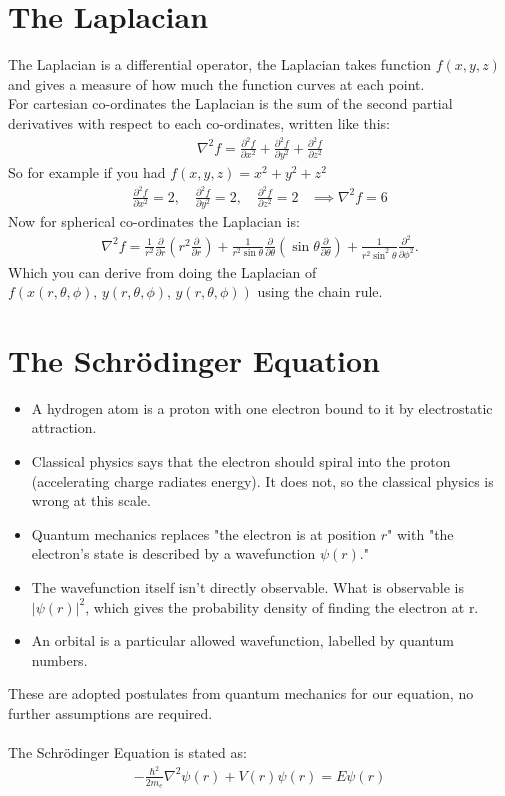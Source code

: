 \documentclass{article}
\begin{document}
\section{The Laplacian}
The Laplacian is a differential operator, the Laplacian takes function $f(x,y,z)$ and gives a measure of how much the function curves at each point.\\
For cartesian co-ordinates the Laplacian is the sum of the second partial derivatives with respect to each co-ordinates, written like this:
\begin{align*}
\nabla^2f = \frac{\partial^2f}{\partial x^2} + \frac{\partial^2f}{\partial y^2} + \frac{\partial^2f}{\partial z^2}        
\end{align*}
So for example if you had $f(x,y,z)=x^2 + y^2 + z^2$
\begin{align*}
    \frac{\partial^2f}{\partial x^2} =2, \quad \frac{\partial^2f}{\partial y^2} = 2, \quad \frac{\partial^2f}{\partial z^2} = 2
    &\implies\nabla^2f = 6
\end{align*}
\newpage
\noindent Now for spherical co-ordinates the Laplacian is:
\begin{align*}
      \nabla^2f
  = \frac{1}{r^2}\frac{\partial}{\partial r}\!\left(r^2 \frac{\partial}{\partial r}\right)
  + \frac{1}{r^2\sin\theta}\frac{\partial}{\partial\theta}\!\left(\sin\theta \frac{\partial}{\partial\theta}\right)
  + \frac{1}{r^2\sin^2\theta}\frac{\partial^2}{\partial\phi^2}.
\end{align*}
Which you can derive from doing the Laplacian of $f(x(r,\theta,\phi),\,y(r,\theta,\phi),\,y(r,\theta,\phi))$ using the chain rule.

\section{The Schrödinger Equation}
\begin{itemize}
  \item A hydrogen atom is a proton with one electron bound to it by electrostatic attraction.
  \item Classical physics says that the electron should spiral into the proton (accelerating charge radiates energy). It does not, so the classical physics is wrong at this scale.
  \item Quantum mechanics replaces "the electron is at position $r$" with "the electron's state is described by a wavefunction $\psi(r)$."
  \item The wavefunction itself isn't directly observable. What is observable is $|\psi(r)|^2$, which gives the probability density of finding the electron at r.
  \item An orbital is a particular allowed wavefunction, labelled by quantum numbers.
\end{itemize}
These are adopted postulates from quantum mechanics for our equation, no further assumptions are required.\\\\
The Schrödinger Equation is stated as:
\begin{align*}
    - \frac{\hbar^2}{2m_e}
    \nabla^2\psi(r)+
    V(r)\psi(r) =
    E\psi(r)
\end{align*}
\end{document}

